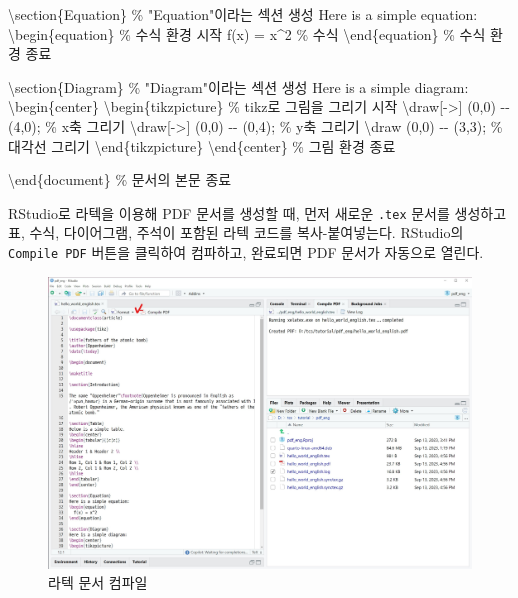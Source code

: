 \documentclass[
  letterpaper,
]{book}
\newenvironment{Shaded}{\begin{snugshade}}{\end{snugshade}}
\newcommand{\CommentTok}[1]{\textcolor[rgb]{0.37,0.37,0.37}{#1}}
\newcommand{\ExtensionTok}[1]{\textcolor[rgb]{0.00,0.23,0.31}{#1}}
\newcommand{\FunctionTok}[1]{\textcolor[rgb]{0.28,0.35,0.67}{#1}}
\newcommand{\KeywordTok}[1]{\textcolor[rgb]{0.00,0.23,0.31}{#1}}
\newcommand{\NormalTok}[1]{\textcolor[rgb]{0.00,0.23,0.31}{#1}}
\newcommand{\SpecialStringTok}[1]{\textcolor[rgb]{0.13,0.47,0.30}{#1}}
\begin{document}
\begin{Shaded}
\begin{Highlighting}[]
\KeywordTok{\textbackslash{}section}\NormalTok{\{Equation\}  }\CommentTok{\% "Equation"이라는 섹션 생성}
\NormalTok{Here is a simple equation:}
\KeywordTok{\textbackslash{}begin}\NormalTok{\{}\ExtensionTok{equation}\NormalTok{\}}\SpecialStringTok{  }\CommentTok{\% 수식 환경 시작}
\SpecialStringTok{  f(x) = x\^{}2  }\CommentTok{\% 수식}
\KeywordTok{\textbackslash{}end}\NormalTok{\{}\ExtensionTok{equation}\NormalTok{\}  }\CommentTok{\% 수식 환경 종료}

\KeywordTok{\textbackslash{}section}\NormalTok{\{Diagram\}  }\CommentTok{\% "Diagram"이라는 섹션 생성}
\NormalTok{Here is a simple diagram:}
\KeywordTok{\textbackslash{}begin}\NormalTok{\{}\ExtensionTok{center}\NormalTok{\}}
\KeywordTok{\textbackslash{}begin}\NormalTok{\{}\ExtensionTok{tikzpicture}\NormalTok{\}  }\CommentTok{\% tikz로 그림을 그리기 시작}
  \FunctionTok{\textbackslash{}draw}\NormalTok{[{-}\textgreater{}] (0,0) {-}{-} (4,0);  }\CommentTok{\% x축 그리기}
  \FunctionTok{\textbackslash{}draw}\NormalTok{[{-}\textgreater{}] (0,0) {-}{-} (0,4);  }\CommentTok{\% y축 그리기}
  \FunctionTok{\textbackslash{}draw}\NormalTok{ (0,0) {-}{-} (3,3);  }\CommentTok{\% 대각선 그리기}
\KeywordTok{\textbackslash{}end}\NormalTok{\{}\ExtensionTok{tikzpicture}\NormalTok{\}}
\KeywordTok{\textbackslash{}end}\NormalTok{\{}\ExtensionTok{center}\NormalTok{\}  }\CommentTok{\% 그림 환경 종료}

\KeywordTok{\textbackslash{}end}\NormalTok{\{}\ExtensionTok{document}\NormalTok{\}  }\CommentTok{\% 문서의 본문 종료}
\end{Highlighting}
\end{Shaded}

RStudio로 라텍을 이용해 PDF 문서를 생성할 때, 먼저 새로운 \texttt{.tex}
문서를 생성하고 표, 수식, 다이어그램, 주석이 포함된 라텍 코드를
복사-붙여넣는다. RStudio의 \texttt{Compile\ PDF} 버튼을 클릭하여
컴파하고, 완료되면 PDF 문서가 자동으로 열린다.

\begin{figure}

{\centering \includegraphics{images/pdf_english_rstudio.jpg}

}

\caption{라텍 문서 컴파일}

\end{figure}
\end{document}
